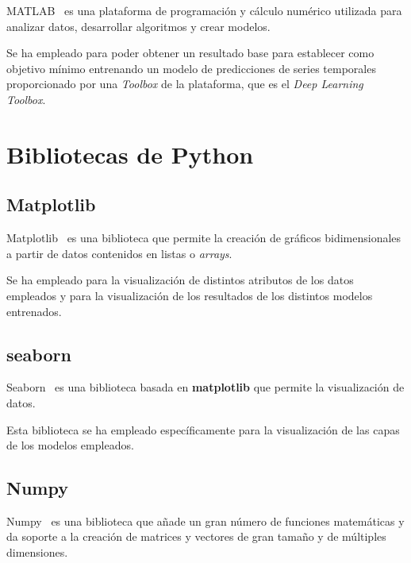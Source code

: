 MATLAB~\cite{matlab} es una plataforma de programación y cálculo numérico utilizada para analizar datos, desarrollar algoritmos y crear modelos.

\par

Se ha empleado para poder obtener un resultado base para establecer como objetivo mínimo entrenando un modelo de predicciones de series temporales proporcionado por una \textit{Toolbox} de la plataforma, que es el \textit{Deep Learning Toolbox}.

\section{Bibliotecas de Python}

\subsection{Matplotlib}

Matplotlib~\cite{plt} es una biblioteca que permite la creación de gráficos bidimensionales a partir de datos contenidos en listas o \textit{arrays}.

\par

Se ha empleado para la visualización de distintos atributos de los datos empleados y para la visualización de los resultados de los distintos modelos entrenados.

\subsection{seaborn}

Seaborn~\cite{seaborn} es una biblioteca basada en \textbf{matplotlib} que permite la visualización de datos.

\par

Esta biblioteca se ha empleado específicamente para la visualización de las capas de los modelos empleados.

\subsection{Numpy}

Numpy~\cite{numpy} es una biblioteca que añade un gran número de funciones matemáticas y da soporte a la creación de matrices y vectores de gran tamaño y de múltiples dimensiones.

\par

